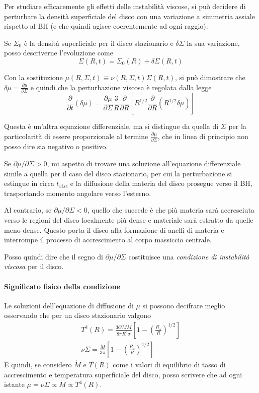 \documentclass[a4paperbi]{article}
\begin{document}
	Per studiare efficacemente gli effetti delle instabilità viscose, si può decidere di perturbare la densità superficiale del disco con una variazione a simmetria assiale rispetto al BH (e che quindi agisce coerentemente ad ogni raggio).
	
	Se $\Sigma_0$ è la densità superficiale per il disco stazionario e $\delta\Sigma$ la sua variazione, posso descriverne l'evoluzione come
	\begin{equation}
		\Sigma(R,t)=\Sigma_0(R)+\delta\Sigma(R,t)
	\end{equation}
	
	Con la sostituzione $\mu(R,\Sigma,t)\equiv\nu(R,\Sigma,t)\Sigma(R,t)$, si può dimostrare che $\delta\mu=\frac{\partial\mu}{\partial\Sigma}$ e quindi che la perturbazione viscosa è regolata dalla legge
	\begin{equation}
		\frac{\partial}{\partial t}(\delta\mu)=\frac{\partial\mu}{\partial\Sigma}\frac{3}{R}\frac{\partial}{\partial R}\left[R^{1/2}\frac{\partial}{\partial R}(R^{1/2}\delta\mu)\right]
	\end{equation}
	
	Questa è un'altra equazione differenziale, ma si distingue da quella di $\Sigma$ per la particolarità di essere proporzionale al termine $\frac{\partial\mu}{\partial\Sigma}$, che in linea di principio non posso dire sia negativo o positivo.
	
	Se $\partial\mu/\partial\Sigma>0$, mi aspetto di trovare una soluzione all'equazione differenziale simile a quella per il caso del disco stazionario, per cui la perturbazione si estingue in circa $t_{visc}$ e la diffusione della materia del disco prosegue verso il BH, trasportando momento angolare verso l'esterno. 
	
	Al contrario, se $\partial\mu/\partial\Sigma<0$, quello che succede è che più materia sarà accresciuta verso le regioni del disco localmente più dense e materiale sarà estratto da quelle meno dense. Questo porta il disco alla formazione di anelli di materia e interrompe il processo di accrescimento al corpo massiccio centrale.
	
	Posso quindi dire che il segno di $\partial\mu/\partial\Sigma$ costituisce una \textit{condizione di instabilità viscosa} per il disco.
	
	\paragraph{Significato fisico della condizione}
	Le soluzioni dell'equazione di diffusione di $\mu$ si possono decifrare meglio osservando che per un disco stazionario valgono
	\begin{gather*}
				T^4(R)=\frac{3GM\dot{M}}{8\pi R^3\sigma}\left[1-\left(\frac{R_{\star}}{R}\right)^{1/2}\right]\\
				\nu\Sigma=\frac{\dot{M}}{3\pi}\left[1-\left(\frac{R_{\star}}{R}\right)^{1/2}\right]
	\end{gather*}
	E quindi, se considero $\dot{M}$ e $T(R)$ come i valori di equilibrio di tasso di accrescimento e temperatura superficiale del disco, posso scrivere che ad ogni istante $\mu=\nu\Sigma\propto\dot{M}\propto T^4(R)$.
	
\end{document}
